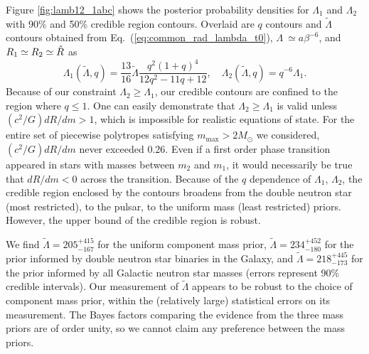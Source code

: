 Figure \ref{fig:lamb12_1abc} shows the posterior probability densities for $\Lambda_1$ and $\Lambda_2$ with 90\% and 50\% credible region contours. Overlaid are $q$ contours and $\tilde{\Lambda}$ contours obtained from Eq.~(\ref{eq:common_rad_lambda_t0}), $\Lambda~\simeq a\beta^{-6}$, and $R_1 \simeq R_2 \simeq \large \hat R$ as
\begin{equation}
\Lambda_1(\tilde{\Lambda},q)={\frac{13}{16}}\tilde{\Lambda}{\frac{q^2(1+q)^4}{12q^2-11q+12}},
\label{eq:l1l2}\quad \Lambda_2(\tilde{\Lambda},q) = q^{-6} \Lambda_1 .\end{equation}
Because of our constraint $\Lambda_2 \geq \Lambda_1$, our credible contours are confined to the region where $q \leq 1$. One can easily demonstrate that $\Lambda_2 \geq \Lambda_1$ is valid unless $(c^2/G)dR/dm > 1$, which is impossible for realistic equations of state. For the entire set of piecewise polytropes satisfying $m_\mathrm{max}>2M_\odot$ we considered, $(c^2/G)dR/dm$ never exceeded 0.26. Even if a first order phase transition appeared in stars with masses between $m_2$ and $m_1$, it would necessarily be true that $dR/dm < 0$ across the transition. Because of the $q$ dependence of $\Lambda_1$, $\Lambda_2$, the credible region enclosed by the contours broadens from the double neutron star (most restricted), to the pulsar, to the uniform mass (least restricted) priors. However, the upper bound of the credible region is robust.

We find $\tilde{\Lambda}=
205^{+415}_{-167}$ for the uniform component mass prior, $\tilde{\Lambda}=234^{+452}_{-180}$ for the prior informed by double neutron star binaries in the Galaxy, and $\tilde{\Lambda}=218^{+445}_{-173}$ for the prior informed by all Galactic neutron star masses (errors represent 90\% credible intervals). Our measurement of $\tilde{\Lambda}$ appears to be robust to the choice of component mass prior, within the (relatively large) statistical errors on its measurement. The Bayes factors comparing the evidence from the three mass priors are of order unity, so we cannot claim any preference between the mass priors.

